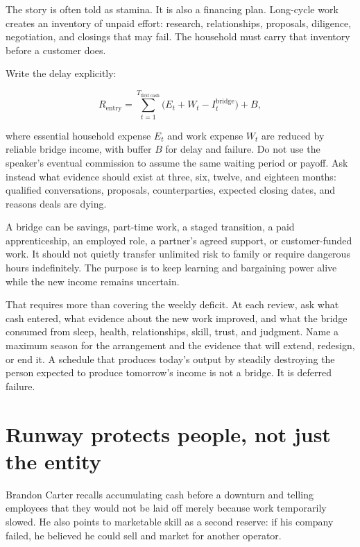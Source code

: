The story is often told as stamina. It is also a financing plan. Long-cycle work
creates an inventory of unpaid effort: research, relationships, proposals,
diligence, negotiation, and closings that may fail. The household must carry
that inventory before a customer does.

Write the delay explicitly:

\begin{equation}
R_{\mathrm{entry}}
  =\sum_{t=1}^{T_{\mathrm{first\ cash}}}
     \bigl(E_t+W_t-I^{\mathrm{bridge}}_t\bigr)
     +B,
\end{equation}

where essential household expense \(E_t\) and work expense \(W_t\) are reduced
by reliable bridge income, with buffer \(B\) for delay and failure. Do not use
the speaker's eventual commission to assume the same waiting period or payoff.
Ask instead what evidence should exist at three, six, twelve, and eighteen
months: qualified conversations, proposals, counterparties, expected closing
dates, and reasons deals are dying.

A bridge can be savings, part-time work, a staged transition, a paid
apprenticeship, an employed role, a partner's agreed support, or customer-funded
work. It should not quietly transfer unlimited risk to family or require
dangerous hours indefinitely. The purpose is to keep learning and bargaining
power alive while the new income remains uncertain.

That requires more than covering the weekly deficit. At each review, ask what
cash entered, what evidence about the new work improved, and what the bridge
consumed from sleep, health, relationships, skill, trust, and judgment. Name a
maximum season for the arrangement and the evidence that will extend, redesign,
or end it. A schedule that produces today's output by steadily destroying the
person expected to produce tomorrow's income is not a bridge. It is deferred
failure.

\section{Runway protects people, not just the entity}

Brandon Carter recalls accumulating cash before a downturn and telling
employees that they would not be laid off merely because work temporarily
slowed. He also points to marketable skill as a second reserve: if his company
failed, he believed he could sell and market for another operator.


